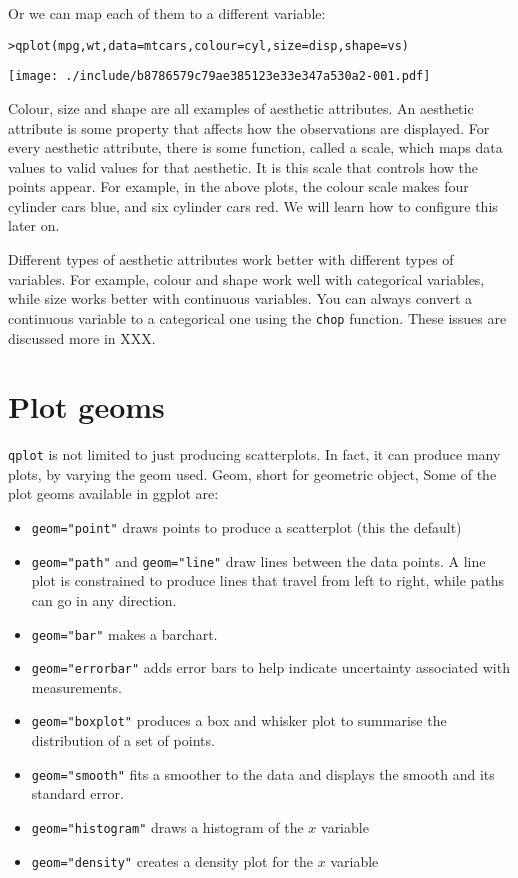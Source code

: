 Or we can map each of them to a different variable:

\begin{alltt}
> qplot(mpg, wt, data = mtcars, colour = cyl, size = disp, shape = vs)
\end{alltt}
\texttt{[image: ./include/b8786579c79ae385123e33e347a530a2-001.pdf]}
\begin{alltt}

\end{alltt}

Colour, size and shape are all examples of aesthetic attributes.  An aesthetic attribute is some property that affects how the observations are displayed.  For every aesthetic attribute, there is some function, called a scale, which maps data values to valid values for that aesthetic.  It is this scale that controls how the points appear.  For example, in the above plots, the colour scale makes four cylinder cars blue, and six cylinder cars red.  We will learn how to configure this later on.

Different types of aesthetic attributes work better with different types of variables.  For example, colour and shape work well with categorical variables, while size works better with continuous variables.  You can always convert a continuous variable to a categorical one using the {\tt chop} function.  These issues are discussed more in XXX.

\section{Plot geoms}\label{sec:plot_geoms}

{\tt qplot} is not limited to just producing scatterplots.  In fact, it can produce many plots, by varying the geom used. Geom, short for geometric object, Some of the plot geoms available in ggplot are:

\begin{itemize}
	\item {\tt geom="point"} draws points to produce a scatterplot (this the default)
	\item {\tt geom="path"} and {\tt geom="line"} draw lines between the data points.  A line plot is constrained to produce lines that travel from left to right, while paths can go in any direction.
	\item {\tt geom="bar"} makes a barchart.
	\item {\tt geom="errorbar"} adds error bars to help indicate uncertainty associated with measurements.
	\item {\tt geom="boxplot"} produces a box and whisker plot to summarise the distribution of a set of points.
	\item {\tt geom="smooth"} fits a smoother to the data and displays the smooth and its standard error.
	\item {\tt geom="histogram"} draws a histogram of the $x$ variable
	\item {\tt geom="density"} creates a density plot for the $x$ variable
\end{itemize}

